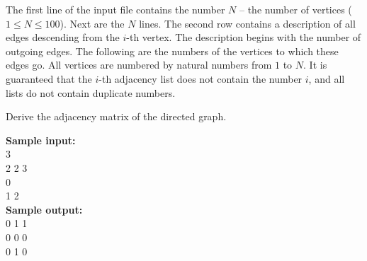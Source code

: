 \documentclass[a4paper]{article}
\begin{document}
The first line of the input file contains the number $N$ -- the number of vertices ($1 \le N \le 100$). Next are the $N$ lines. The second row contains a description of all edges descending from the $i$-th vertex. The description begins with the number of outgoing edges. The following are the numbers of the vertices to which these edges go. All vertices are numbered by natural numbers from $1$ to $N$. It is guaranteed that the $i$-th adjacency list does not contain the number $i$, and all lists do not contain duplicate numbers.

Derive the adjacency matrix of the directed graph.

\LINE

\noindent \textbf{Sample input:}\\
3\\
2 2 3\\
0\\
1 2\\

\noindent \textbf{Sample output:}\\
0 1 1\\
0 0 0\\
0 1 0\\
\end{document}
